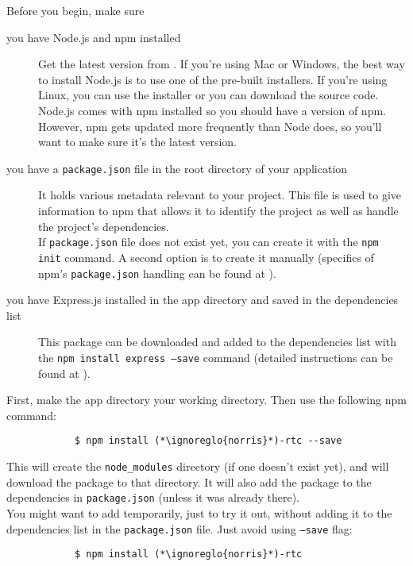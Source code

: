 		Before you begin, make sure
		\begin{description}
			\item[you have Node.js and npm installed] Get the latest version from . If you're using Mac or Windows, the best way to install Node.js is to use one of the pre-built installers. If you're using Linux, you can use the installer or you can download the source code.\\
			Node.js comes with npm installed so you should have a version of npm. However, npm gets updated more frequently than Node does, so you'll want to make sure it's the latest version.
			\item[you have a \texttt{package.json} file in the root directory of your application] It holds various metadata relevant to your project. This file is used to give information to npm that allows it to identify the project as well as handle the project's dependencies.\\
			If \texttt{package.json} file does not exist yet, you can create it with the \texttt{npm init} command. A second option is to create it manually (specifics of npm's \texttt{package.json} handling can be found at ).
			\item[you have Express.js installed in the app directory and saved in the dependencies list] This package can be downloaded and added to the dependencies list with the \texttt{npm install express --save} command (detailed instructions can be found at ).
		\end{description}
		First, make the app directory your working directory. Then use the following npm command:
		\begin{lstlisting}
			$ npm install (*\ignoreglo{norris}*)-rtc --save
		\end{lstlisting}
		This will create the \texttt{node\_modules} directory (if one doesn't exist yet), and will download the package to that directory. It will also add the package to the dependencies in \texttt{package.json} (unless it was already there).\\
		You might want to add  temporarily, just to try it out, without adding it to the dependencies list in the \texttt{package.json} file. Just avoid using \texttt{--save} flag:
		\begin{lstlisting}
			$ npm install (*\ignoreglo{norris}*)-rtc
		\end{lstlisting}